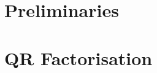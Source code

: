 \documentclass[a4paper,11pt,twoside]{report}
\begin{document}
\chapter{Preliminaries}


\chapter{QR Factorisation}


% 

% 

% 

% 
% 
\end{document}
